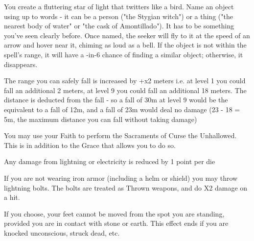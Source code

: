 {You create a fluttering star of light that twitters like a bird.  Name an object using up to \DICE words - it can be a person ("the Stygian witch") or a thing ("the nearest body of water" or "the cask of Amontillado").  It has to be something you've seen clearly before.  Once named, the seeker will fly to it at the speed of an arrow and hover near it, chiming as loud as a bell.  If the object is not within the spell's range, it will have a \DICE-in-6 chance of finding a similar object; otherwise, it disappears.




\GOD[
Name=Empress Wa,
Link=small-god-empress wa,
GodOf=God of the Heavens,
Holy=a jade diadem
]


The range you can safely fall is increased by +\LVL x2 meters i.e. at level 1 you could fall an additional 2 meters, at level 9 you could fall an additional 18 meters.  The distance is deducted from the fall - so a fall of 30m at level 9 would be the equivalent to a fall of 12m, and a fall of 23m would deal no damage (23 - 18 = 5m, the maximum distance you can fall without taking damage)


You may use your Faith to perform the Sacraments of Curse the Unhallowed.  This is in addition to the Grace that allows you to do so.




\GOD[
Name=Raiden,
Link=small-god-raiden,
GodOf=Lord of Lightning,
Holy=two iron bracers with lightning bolts etched on them
]


Any damage from lightning or electricity is reduced by 1 point per die


If you are not wearing iron armor (including a helm or shield) you may throw lightning bolts.  The bolts are treated as Thrown weapons, and do \DICE X2 damage on a hit.




\GOD[
Name=Raimonds Mountainhand,
Link=small-god-raimonds mountainhand,
GodOf=Seraph of the Mountaintops,
Holy=3 iron spikes in the shape of icicles or teeth hung from the neck
]


If you choose, your feet cannot be moved from the spot you are standing, provided you are in contact with stone or earth. This effect ends if you are knocked unconscious, struck dead, etc.

}
